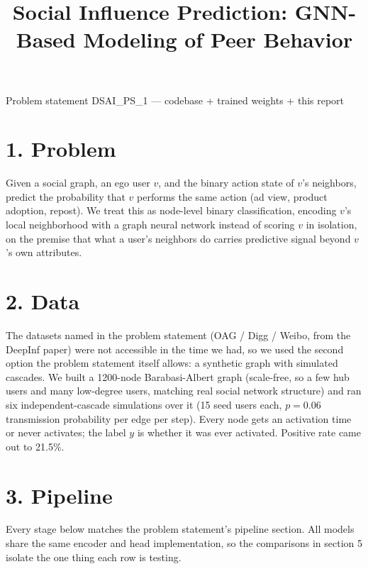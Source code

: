 \documentclass[11pt]{article}
\title{\vspace{-1.5em}Social Influence Prediction: GNN-Based Modeling of Peer Behavior}
\author{}
\date{}
\begin{document}
\maketitle
\vspace{-3em}
{\small Problem statement DSAI\_PS\_1 --- codebase + trained weights + this report}

\section*{1. Problem}
Given a social graph, an ego user $v$, and the binary action state of $v$'s neighbors, predict the probability that $v$ performs the same action (ad view, product adoption, repost). We treat this as node-level binary classification, encoding $v$'s local neighborhood with a graph neural network instead of scoring $v$ in isolation, on the premise that what a user's neighbors do carries predictive signal beyond $v$'s own attributes.

\section*{2. Data}
The datasets named in the problem statement (OAG / Digg / Weibo, from the DeepInf paper) were not accessible in the time we had, so we used the second option the problem statement itself allows: a synthetic graph with simulated cascades. We built a 1200-node Barabasi-Albert graph (scale-free, so a few hub users and many low-degree users, matching real social network structure) and ran six independent-cascade simulations over it (15 seed users each, $p=0.06$ transmission probability per edge per step). Every node gets an activation time or never activates; the label $y$ is whether it was ever activated. Positive rate came out to 21.5\%.

\section*{3. Pipeline}
Every stage below matches the problem statement's pipeline section. All models share the same encoder and head implementation, so the comparisons in section 5 isolate the one thing each row is testing.
\end{document}
